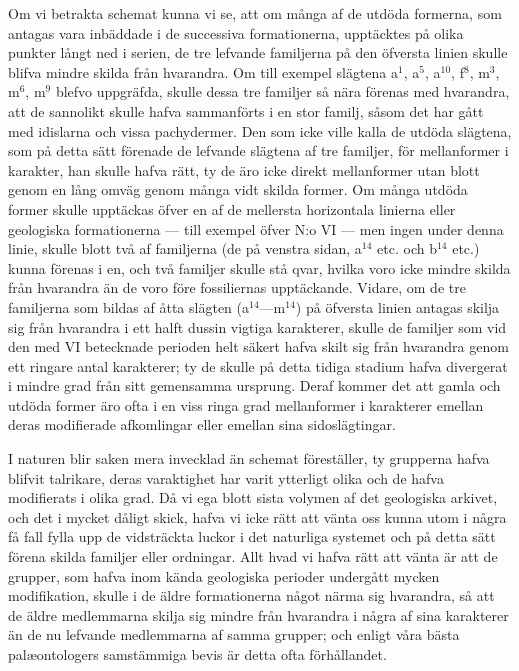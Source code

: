 Om vi betrakta schemat kunna vi se, att om många af de utdöda formerna, som antagas vara inbäddade i de successiva formationerna, upptäcktes på olika punkter långt ned i serien, de tre lefvande familjerna på den öfversta linien skulle blifva mindre skilda från hvarandra. Om till exempel slägtena a${}^{1}$, a${}^{5}$, a${}^{10}$, f${}^{8}$, m${}^{3}$, m${}^{6}$, m${}^{9}$ blefvo uppgräfda, skulle dessa tre familjer så nära förenas med hvarandra, att de sannolikt skulle hafva sammanförts i en stor familj, såsom det har gått med idislarna och vissa pachydermer. Den som icke ville kalla de utdöda slägtena, som på detta sätt förenade de lefvande slägtena af tre familjer, för mellanformer i karakter, han skulle hafva rätt, ty de äro icke direkt mellanformer utan blott genom en lång omväg genom många vidt skilda former. Om många utdöda former skulle upptäckas öfver en af de mellersta horizontala linierna eller geologiska formationerna — till exempel öfver N:o VI — men ingen under denna linie, skulle blott två af familjerna (de på venstra sidan, a${}^{14}$ etc. och b${}^{14}$ etc.) kunna förenas i en, och två familjer skulle stå qvar, hvilka voro icke mindre skilda från hvarandra än de voro före fossiliernas upptäckande. Vidare, om de tre familjerna som bildas af åtta slägten (a${}^{14}$—m${}^{14}$) på öfversta linien antagas skilja sig från hvarandra i ett halft dussin vigtiga karakterer, skulle de familjer som vid den med VI betecknade perioden helt säkert hafva skilt sig från hvarandra genom ett ringare antal karakterer; ty de skulle på detta tidiga stadium hafva divergerat i mindre grad från sitt gemensamma ursprung. Deraf kommer det att gamla och utdöda former äro ofta i en viss ringa grad mellanformer i karakterer emellan deras modifierade afkomlingar eller emellan sina sidoslägtingar.

I naturen blir saken mera invecklad än schemat föreställer, ty grupperna hafva blifvit talrikare, deras varaktighet har varit ytterligt olika och de hafva modifierats i olika grad. Då vi ega blott sista volymen af det geologiska arkivet, och det i mycket dåligt skick, hafva vi icke rätt att vänta oss kunna utom i några få fall fylla upp de vidsträckta luckor i det naturliga systemet och på detta sätt förena skilda familjer eller ordningar. Allt hvad vi hafva rätt att vänta är att de grupper, som hafva inom kända geologiska perioder undergått mycken modifikation, skulle i de äldre formationerna något närma sig hvarandra, så att de äldre medlemmarna skilja sig mindre från hvarandra i några af sina karakterer än de nu lefvande medlemmarna af samma grupper; och enligt våra bästa palæontologers samstämmiga bevis är detta ofta förhållandet.

